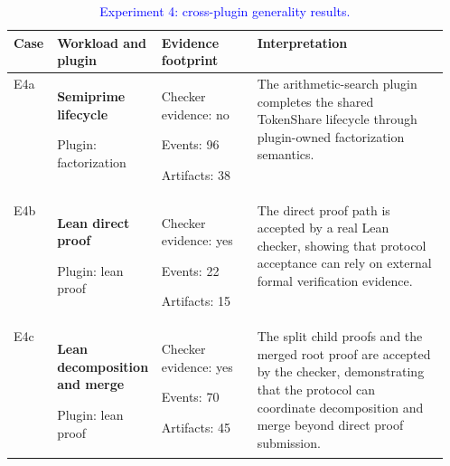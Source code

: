 \documentclass{article}
\theoremstyle{plain}
\begin{document}
\begin{table}[!htbp]
\centering
\caption{\textcolor{blue}{Experiment 4: cross-plugin generality results.}}
\label{tab:cross-plugin-results}
\footnotesize
{\color{blue}
\begin{tabularx}{0.96\linewidth}{
  @{}
  >{\raggedright\arraybackslash}p{0.10\linewidth}
  >{\raggedright\arraybackslash}p{0.24\linewidth}
  >{\raggedright\arraybackslash}p{0.22\linewidth}
  >{\raggedright\arraybackslash}X
  @{}
}
\toprule
Case & Workload and plugin & Evidence footprint & Interpretation \\
\midrule

E4a
&
\begin{minipage}[t]{\linewidth}
\textbf{Semiprime lifecycle}

Plugin: factorization
\end{minipage}
&
\begin{minipage}[t]{\linewidth}
Checker evidence: no

Events: 96

Artifacts: 38
\end{minipage}
&
\begin{minipage}[t]{\linewidth}
The arithmetic-search plugin completes the shared TokenShare lifecycle through plugin-owned factorization semantics.
\end{minipage}
\\[1.0em]

E4b
&
\begin{minipage}[t]{\linewidth}
\textbf{Lean direct proof}

Plugin: lean proof
\end{minipage}
&
\begin{minipage}[t]{\linewidth}
Checker evidence: yes

Events: 22

Artifacts: 15
\end{minipage}
&
\begin{minipage}[t]{\linewidth}
The direct proof path is accepted by a real Lean checker, showing that protocol acceptance can rely on external formal verification evidence.
\end{minipage}
\\[1.0em]

E4c
&
\begin{minipage}[t]{\linewidth}
\textbf{Lean decomposition and merge}

Plugin: lean proof
\end{minipage}
&
\begin{minipage}[t]{\linewidth}
Checker evidence: yes

Events: 70

Artifacts: 45
\end{minipage}
&
\begin{minipage}[t]{\linewidth}
The split child proofs and the merged root proof are accepted by the checker, demonstrating that the protocol can coordinate decomposition and merge beyond direct proof submission.
\end{minipage}
\\

\bottomrule
\end{tabularx}
}
\end{table}
\end{document}
